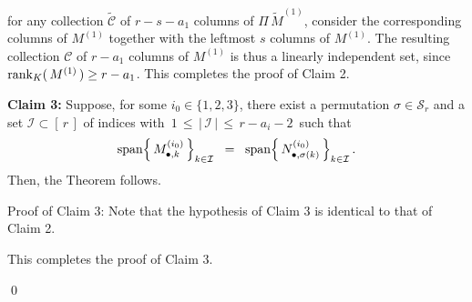 for any collection $\widetilde{\mathcal{C}}$ of $r - s - a_{1}$ columns of $\Pi\,\widetilde{M}^{(1)}$,
consider the corresponding columns of $M^{(1)}$ together with the leftmost $s$ columns of $M^{(1)}$.
The resulting collection $\mathcal{C}$ of $r-a_{1}$ columns of $M^{(1)}$ is thus a linearly independent set, since
$\textnormal{rank}_{K}(\,M^{(1)}\,) \geq r - a_{1}$.
This completes the proof of Claim 2.

\vskip 0.5cm
\begin{center}
\begin{minipage}{6.0in}
\textbf{Claim 3:}
\vskip 0.025cm
\noindent
Suppose, for some $i_{0} \in \{1,2,3\}$, there exist a permutation $\sigma \in \mathcal{S}_{r}$
and a set $\mathcal{I} \subset \left[\,r\,\right]$ of indices with
\,$1 \,\leq\, \left\vert\,\mathcal{I}\,\right\vert \,\leq\, r - a_{i} - 2$\, such that
\begin{equation*}
\textnormal{span}\!\left\{\,M^{(i_{0})}_{\bullet,k}\,\right\}_{k\in\mathcal{I}}
\;\; = \;\;
\textnormal{span}\!\left\{\,N^{(i_{0})}_{\bullet,\sigma(k)}\,\right\}_{k\in\mathcal{I}}.
\end{equation*}
Then, the Theorem follows.
\end{minipage}
\end{center}
Proof of Claim 3:\; Note that the hypothesis of Claim 3 is identical to that of Claim 2.

This completes the proof of Claim 3.

\qed

